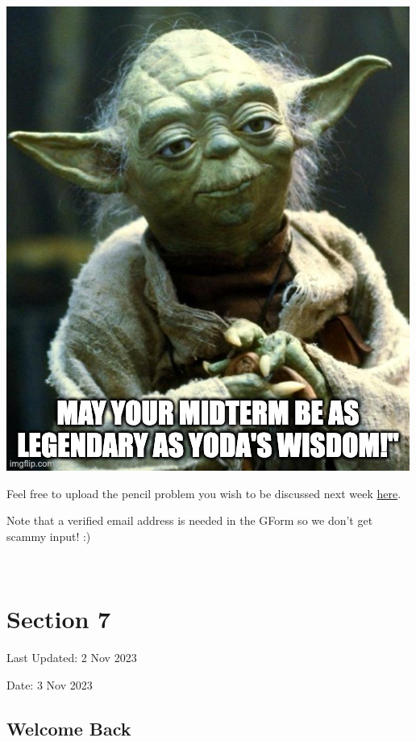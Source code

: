 \documentclass[
  letterpaper,
  DIV=11,
  numbers=noendperiod]{scrreprt}
\theoremstyle{plain}
\theoremstyle{definition}
\theoremstyle{remark}
\begin{document}
\includegraphics{./assets/img/gluck.jpeg}

Feel free to upload the pencil problem you wish to be discussed next
week \href{https://forms.gle/RBmMNYJp4u3qD5W79}{here}.

Note that a verified email address is needed in the GForm so we don't
get scammy input! :)

\(\,\)


\hypertarget{section-7}{%
\chapter*{Section 7}\label{section-7}}


Last Updated: 2 Nov 2023

Date: 3 Nov 2023

\hypertarget{welcome-back}{%
\section*{Welcome Back}\label{welcome-back}}
\end{document}
